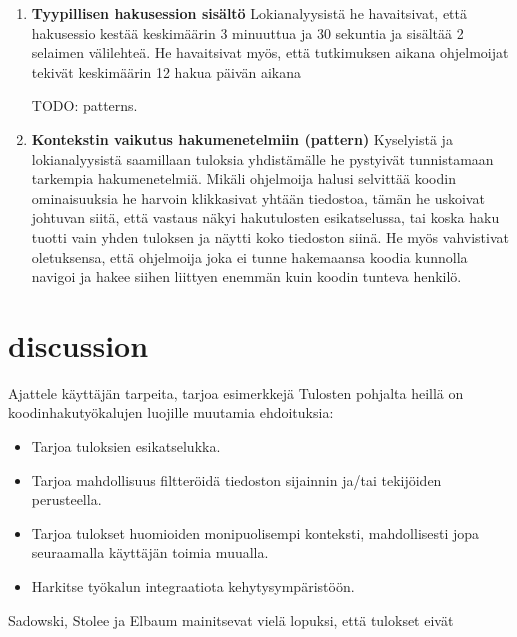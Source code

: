 \documentclass[finnish]{../tktltiki2}
\theoremstyle{definition}
\theoremstyle{remark}
\begin{document}
\begin{enumerate}
  \item {\bf Tyypillisen hakusession sisältö}
    Lokianalyysistä he havaitsivat, että hakusessio kestää keskimäärin 3 minuuttua ja 30 sekuntia ja sisältää 2 selaimen välilehteä. He havaitsivat myös, että tutkimuksen aikana ohjelmoijat tekivät keskimäärin 12 hakua päivän aikana

    TODO: patterns.

  \item {\bf Kontekstin vaikutus hakumenetelmiin (pattern)}
    Kyselyistä ja lokianalyysistä saamillaan tuloksia yhdistämälle he pystyivät tunnistamaan tarkempia hakumenetelmiä. Mikäli ohjelmoija halusi selvittää koodin ominaisuuksia he harvoin klikkasivat yhtään tiedostoa, tämän he uskoivat johtuvan siitä, että vastaus näkyi hakutulosten esikatselussa, tai koska haku tuotti vain yhden tuloksen ja näytti koko tiedoston siinä. He myös vahvistivat oletuksensa, että ohjelmoija joka ei tunne hakemaansa koodia kunnolla navigoi ja hakee siihen liittyen enemmän kuin koodin tunteva henkilö.

\end{enumerate}

\section{discussion}

Ajattele käyttäjän tarpeita, tarjoa esimerkkejä
Tulosten pohjalta heillä on koodinhakutyökalujen luojille muutamia ehdoituksia:
\begin{itemize}
    \item Tarjoa tuloksien esikatselukka.
    \item Tarjoa mahdollisuus filtteröidä tiedoston sijainnin ja/tai tekijöiden perusteella.
    \item Tarjoa tulokset huomioiden monipuolisempi konteksti, mahdollisesti jopa seuraamalla käyttäjän toimia muualla.
    \item Harkitse työkalun integraatiota kehytysympäristöön.
\end{itemize}


Sadowski, Stolee ja Elbaum mainitsevat vielä lopuksi, että tulokset eivät

%
%
% 
%







%
\end{document}
